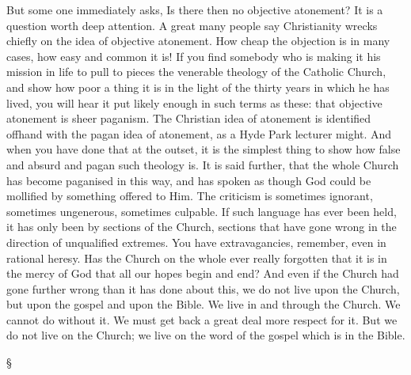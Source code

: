 \documentclass[12pt,letterpaper,oneside]{book}
\begin{document}
But some one immediately asks, Is there then 
no objective atonement? It is a question worth 
deep attention. A great many people say 
Christianity wrecks chiefly on the idea of objective 
atonement. How cheap the objection is 
in many cases, how easy and common it is! If 
you find somebody who is making it his mission 
in life to pull to pieces the venerable theology of 
the Catholic Church, and show how poor a thing 
it is in the light of the thirty years in which he 
has lived, you will hear it put likely enough in 
such terms as these: that objective atonement is 
sheer paganism. The Christian idea of atonement 
is identified offhand with the pagan idea 
of atonement, as a Hyde Park lecturer might. 
And when you have done that at the outset, it 
is the simplest thing to show how false and 
absurd and pagan such theology is. It is said 
further, that the whole Church has become 
paganised in this way, and has spoken as though 
God could be mollified by something offered to 
Him. The criticism is sometimes ignorant, 
sometimes ungenerous, sometimes culpable. If 
such language has ever been held, it has only 
been by sections of the Church, sections that 
have gone wrong in the direction of unqualified 
extremes. You have extravagancies, remember, 
even in rational heresy. Has the Church on 
the whole ever really forgotten that it is in 
the mercy of God that all our hopes begin and 
end? And even if the Church had gone further 
wrong than it has done about this, we do not 
live upon the Church, but upon the gospel and 
upon the Bible. We live in and through the 
Church. We cannot do without it. We must 
get back a great deal more respect for it. But 
we do not live on the Church; we live on the 
word of the gospel which is in the Bible. 

\begin{center}
\S
\end{center}
\end{document}
